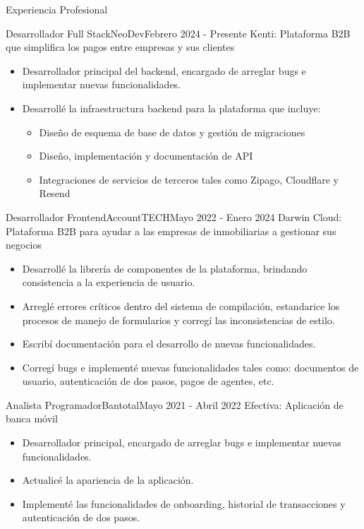 \documentclass[]{mcdowell-cv/mcdowellcv}
\begin{document}
    \begin{cvsection}{Experiencia Profesional}
        \begin{cvsubsection}{Desarrollador Full Stack}{NeoDev}{Febrero 2024 - Presente}
            Kenti: Plataforma B2B que simplifica los pagos entre empresas y sus clientes
            \begin{itemize}
                \item Desarrollador principal del backend, encargado de arreglar bugs e implementar nuevas funcionalidades.
                \item Desarrollé la infraestructura backend para la plataforma que incluye:
                \begin {itemize}
                    \item Diseño de esquema de base de datos y gestión de migraciones
                    \item Diseño, implementación y documentación de API
                    \item Integraciones de servicios de terceros tales como Zipago, Cloudflare y Resend
                \end{itemize}
            \end{itemize}
        \end{cvsubsection}

        \begin{cvsubsection}{Desarrollador Frontend}{AccountTECH}{Mayo 2022 - Enero 2024}
            Darwin Cloud: Plataforma B2B para ayudar a las empresas de inmobiliarias a gestionar sus negocios
            \begin{itemize}
                \item Desarrollé la librería de componentes de la plataforma, brindando consistencia a la experiencia de usuario.
                \item Arreglé errores críticos dentro del sistema de compilación, estandarice los procesos de manejo de formularios y corregí las inconsistencias de estilo.
                \item Escribí documentación para el desarrollo de nuevas funcionalidades.
                \item Corregí bugs e implementé nuevas funcionalidades tales como: documentos de usuario, autenticación de dos pasos, pagos de agentes, etc.
            \end{itemize}
        \end{cvsubsection}

        \begin{cvsubsection}{Analista Programador}{Bantotal}{Mayo 2021 - Abril 2022}
            Efectiva: Aplicación de banca móvil
            \begin{itemize}
                \item Desarrollador principal, encargado de arreglar bugs e implementar nuevas funcionalidades.
                \item Actualicé la apariencia de la aplicación.
                \item Implementé las funcionalidades de onboarding, historial de transacciones y autenticación de dos pasos.
            \end{itemize}


\end{cvsubsection}
\end{cvsection}
\end{document}
